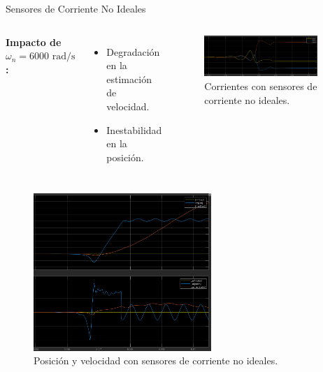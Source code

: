 \documentclass[12pt]{beamer}
\begin{document}
\begin{frame}{Sensores de Corriente No Ideales}
    \begin{columns}
        \textbf{Impacto de \(\omega_n = 6000 \text{ rad/s}\):}
        \begin{itemize}
            \item Degradación en la estimación de velocidad.
            \item Inestabilidad en la posición.
        \end{itemize}

        \begin{figure}
            \centering
            \includegraphics[width=0.9\textwidth]{Imagenes/7_corNI_6000_c.png}
            \caption{Corrientes con sensores de corriente no ideales.}
        \end{figure}
    \end{columns}

    \begin{figure}
        \centering
        \includegraphics[width=0.6\textwidth]{Imagenes/8_corNI_6000_pw.png}
        \caption{Posición y velocidad con sensores de corriente no ideales.}
    \end{figure}
\end{frame}
\end{document}
